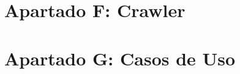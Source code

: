 	\chapter{Apartado F: Crawler}
		\label{crawler}
	

	\chapter{Apartado G: Casos de Uso}
		\label{CasosdeUso}
		
		
		
		
		
		
		
		
		
		
		
		
		 
		 
		
		
		
		
		
		
		
		
		
		
		
		
		
		
		
		
		
		
		
		
		
	\pagebreak	
	
